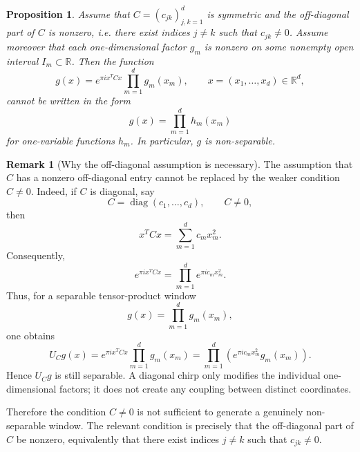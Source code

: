 \documentclass[final,1p,times,authoryear]{elsarticle}
\newtheorem{proposition}[theorem]{Proposition}
\theoremstyle{definition}
\newtheorem{remark}[theorem]{Remark}
\newcommand{\R}{\mathbb{R}}
\newcommand{\1}{\mathbf{1}}
\begin{document}
\begin{proposition}\label{prop:nonseparable}
Assume that $C=(c_{jk})_{j,k=1}^d$ is symmetric and {the off-diagonal part of $C$ is nonzero, i.e.
there exist indices $j\neq k$ such that
$c_{jk}\neq0$.}
Assume moreover that each one-dimensional factor $g_m$ is nonzero on some nonempty open interval $I_m\subset \R$.
Then the function
$$
g(x)=e^{\pi i x^TCx}\prod_{m=1}^d g_m(x_m),
\qquad x=(x_1,\dots,x_d)\in \R^d,
$$
cannot be written in the form
$$
g(x)=\prod_{m=1}^d h_m(x_m)
$$
for one-variable functions $h_m$. In particular, $g$ is non-separable.
\end{proposition}
\begin{remark}[Why the off-diagonal assumption is necessary]
{The assumption that $C$ has a nonzero off-diagonal entry cannot be replaced by the weaker condition
$C\neq 0$. Indeed, if $C$ is diagonal, say
$$
C=\operatorname{diag}(c_1,\dots,c_d),
\qquad C\neq 0,
$$
then
$$
x^T Cx=\sum_{m=1}^d c_m x_m^2.
$$
Consequently,
$$
e^{\pi i x^T Cx}
=
\prod_{m=1}^d e^{\pi i c_m x_m^2}.
$$
Thus, for a separable tensor-product window
$$
g(x)=\prod_{m=1}^d g_m(x_m),
$$
one obtains
$$
U_C g(x)
=
e^{\pi i x^T Cx}\prod_{m=1}^d g_m(x_m)
=
\prod_{m=1}^d
\left(e^{\pi i c_m x_m^2}g_m(x_m)\right).
$$
Hence $U_C g$ is still separable. A diagonal chirp only modifies the individual one-dimensional
factors; it does not create any coupling between distinct coordinates.}

{Therefore the condition $C\neq 0$ is not sufficient to generate a genuinely non-separable window.
The relevant condition is precisely that the off-diagonal part of $C$ be nonzero, equivalently that
there exist indices $j\neq k$ such that $c_{jk}\neq 0$.}
\end{remark}
\end{document}
